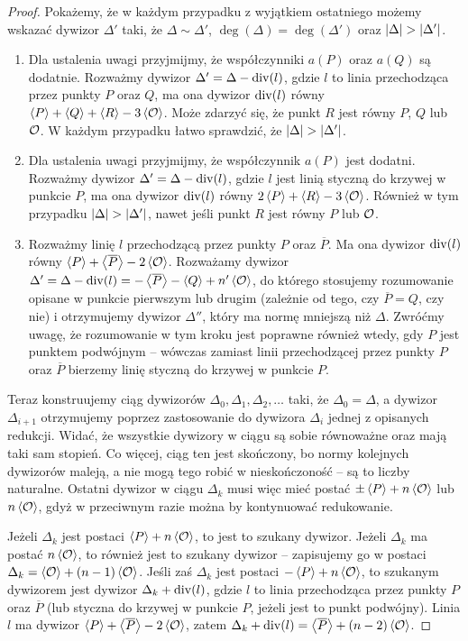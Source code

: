 \begin{proof}
Pokażemy, że w każdym przypadku z wyjątkiem ostatniego
możemy wskazać dywizor $\Delta'$ taki,
że $\Delta \sim \Delta'$, $\deg(\Delta) = \deg(\Delta')$
oraz $\lvert\Delta\rvert > \lvert\Delta'\rvert$.
\begin{enumerate}
\item Dla ustalenia uwagi przyjmijmy,
że współczynniki $a(P)$ oraz $a(Q)$ są dodatnie.
Rozważmy dywizor $\Delta' = \Delta - \operatorname{div}(l)$,
gdzie $l$ to linia przechodząca przez punkty $P$ oraz $Q$,
ma ona dywizor $\operatorname{div}(l)$ równy
$\left\langle P\right\rangle + \left\langle Q\right\rangle + \left\langle R\right\rangle - 3\left\langle\mathcal{O}\right\rangle$.
Może zdarzyć się, że punkt $R$ jest równy $P$, $Q$ lub $\mathcal{O}$.
W każdym przypadku łatwo sprawdzić, że $\lvert\Delta\rvert > \lvert\Delta'\rvert$.
\item Dla ustalenia uwagi przyjmijmy, że współczynnik $a(P)$ jest dodatni.
Rozważmy dywizor $\Delta' = \Delta - \operatorname{div}(l)$,
gdzie $l$ jest linią styczną do krzywej w punkcie $P$,
ma ona dywizor $\operatorname{div}(l)$ równy $2\left\langle P\right\rangle + \left\langle R\right\rangle - 3\left\langle\mathcal{O}\right\rangle$.
Również w tym przypadku $\lvert\Delta\rvert > \lvert\Delta'\rvert$,
nawet jeśli punkt $R$ jest równy $P$ lub $\mathcal{O}$.
\item Rozważmy linię $l$ przechodzącą przez punkty $P$ oraz $\overline{P}$.
Ma ona dywizor $\operatorname{div}(l)$ równy
$\left\langle P\right\rangle + \left\langle\overline{P}\right\rangle - 2\left\langle\mathcal{O}\right\rangle$.
Rozważamy dywizor
$\Delta' =
\Delta - \operatorname{div}(l) =
-\left\langle\overline{P}\right\rangle - \left\langle Q\right\rangle + n'\left\langle\mathcal{O}\right\rangle$,
do którego stosujemy rozumowanie opisane w punkcie pierwszym lub drugim
(zależnie od tego, czy $\overline{P} = Q$, czy nie)
i otrzymujemy dywizor $\Delta''$, który ma normę mniejszą niż $\Delta$.
Zwróćmy uwagę, że rozumowanie w tym kroku jest poprawne również wtedy,
gdy $P$ jest punktem podwójnym --
wówczas zamiast linii przechodzącej przez punkty $P$ oraz $\overline{P}$
bierzemy linię styczną do krzywej w punkcie $P$.
\end{enumerate}

Teraz konstruujemy ciąg dywizorów
$\Delta_0, \Delta_1, \Delta_2, \ldots$ taki,
że $\Delta_0 = \Delta$,
a dywizor $\Delta_{i+1}$ otrzymujemy
poprzez zastosowanie do dywizora $\Delta_i$ jednej z opisanych redukcji.
Widać, że wszystkie dywizory w ciągu są sobie równoważne
oraz mają taki sam stopień.
Co więcej, ciąg ten jest skończony,
bo normy kolejnych dywizorów maleją,
a nie mogą tego robić w nieskończoność -- są to liczby naturalne.
Ostatni dywizor w ciągu $\Delta_k$ musi więc mieć postać
$\pm\left\langle P\right\rangle + n\left\langle\mathcal{O}\right\rangle$ lub $n\left\langle\mathcal{O}\right\rangle$,
gdyż w przeciwnym razie można by kontynuować redukowanie.

Jeżeli $\Delta_k$ jest postaci $\left\langle P\right\rangle + n\left\langle\mathcal{O}\right\rangle$,
to jest to szukany dywizor.
Jeżeli $\Delta_k$ ma postać $n\left\langle\mathcal{O}\right\rangle$,
to również jest to szukany dywizor --
zapisujemy go w postaci $\Delta_k = \left\langle\mathcal{O}\right\rangle + (n-1)\left\langle\mathcal{O}\right\rangle$.
Jeśli zaś $\Delta_k$ jest postaci $-\left\langle P\right\rangle + n\left\langle\mathcal{O}\right\rangle$,
to szukanym dywizorem jest dywizor
$\Delta_k + \operatorname{div}(l)$,
gdzie $l$ to linia przechodząca przez punkty $P$ oraz $\overline{P}$
(lub styczna do krzywej w punkcie $P$, jeżeli jest to punkt podwójny).
Linia $l$ ma dywizor $\left\langle P\right\rangle + \left\langle\overline{P}\right\rangle - 2\left\langle\mathcal{O}\right\rangle$,
zatem $\Delta_k + \operatorname{div}(l) = \left\langle\overline{P}\right\rangle + (n-2)\left\langle\mathcal{O}\right\rangle$.
\end{proof}

